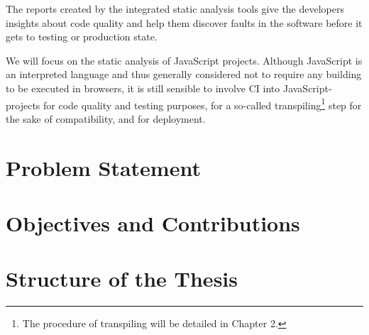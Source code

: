 The reports created by the integrated static analysis tools give the developers insights about code quality and help them discover faults in the software before it gets to testing or production state.

We will focus on the static analysis of JavaScript projects. Although JavaScript is an interpreted language and thus generally considered not to require any building to be executed in browsers, it is still sensible to involve CI into JavaScript-projects for code quality and testing purposes, for a so-called transpiling\footnote{The procedure of transpiling will be detailed in Chapter 2.} step for the sake of compatibility, and for deployment.

\section{Problem Statement}

\section{Objectives and Contributions}

\section{Structure of the Thesis}

